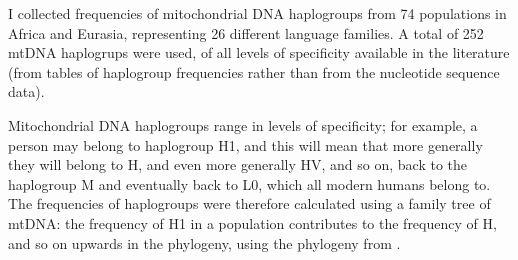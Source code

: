 \documentclass[output=paper]{langsci/langscibook}
\begin{document}









I collected frequencies of mitochondrial DNA haplogroups from 74 populations in Africa and
Eurasia, representing 26 different language families. A total of 252 mtDNA haplogrups were used,
of all levels of specificity available in the literature (from tables of haplogroup frequencies rather
than from the nucleotide sequence data).

  Mitochondrial DNA haplogroups range in levels of specificity; for example, a person may belong to
haplogroup H1, and this will mean that more generally they will belong to H, and even more
generally HV, and so on, back to the haplogroup M and eventually back to L0, which all modern
humans belong to. The frequencies of haplogroups were therefore calculated using a family tree of
mtDNA: the frequency of H1 in a population contributes to the frequency of H, and so on upwards
in the phylogeny, using the phylogeny from \citet{vanOven2009}.
\end{document}
